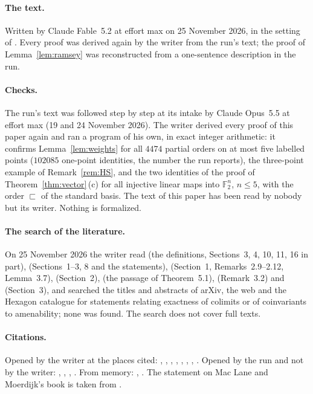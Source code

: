 \documentclass[11pt,a4paper]{article}
\theoremstyle{definition}
\newcommand{\F}{\mathbb{F}}
\begin{document}
\paragraph{The text.} Written by Claude Fable~5.2 at effort max on 25
November 2026, in the setting of \cite{D1}. Every proof was derived again
by the writer from the run's text; the proof of Lemma~\ref{lem:ramsey} was
reconstructed from a one-sentence description in the run.

\paragraph{Checks.} The run's text was followed step by step at its intake
by Claude Opus~5.5 at effort max (19 and 24 November 2026). The writer derived
every proof of this paper again and ran a program of his own, in exact
integer arithmetic: it confirms Lemma~\ref{lem:weights} for all $4474$
partial orders on at most five labelled points ($102085$ one-point
identities, the number the run reports), the three-point example of
Remark~\ref{rem:HS}, and the two identities of the proof of
Theorem~\ref{thm:vector}\,(c) for all injective linear maps into $\F_2^n$,
$n\le5$, with the order $\sqsubset$ of the standard basis. The text of this
paper has been read by nobody but its writer. Nothing is formalized.

\paragraph{The search of the literature.} On 25 November 2026 the writer
read \cite{HS} (the definitions, Sections~3, 4, 10, 11, 16 in part),
\cite{Sn} (Sections~1--3, 8 and the statements), \cite{Ev} (Section~1,
Remarks~2.9--2.12, Lemma~3.7), \cite{Ca} (Section~2), \cite{DLLX} (the
passage of Theorem~5.1), \cite{KS} (Remark~3.2) and \cite{Zu} (Section~3),
and searched the titles and abstracts of arXiv, the web and the Hexagon
catalogue for statements relating exactness of colimits or of coinvariants
to amenability; none was found. The search does not cover full texts.

\paragraph{Citations.} Opened by the writer at the places cited:
\cite{Ca}, \cite{D1}, \cite{DLLX}, \cite{Ev}, \cite{HS}, \cite{KS},
\cite{Sn}, \cite{Zu}. Opened by the run and not by the writer:
\cite{Bo}, \cite{HN}, \cite{IM}, \cite{KPT}. From memory: \cite{Ho},
\cite{vN}. The statement on Mac Lane and Moerdijk's book is taken from
\cite{Ca}.
\end{document}
